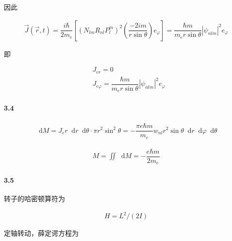 \documentclass{article}
\newcommand*{\md}{\mathop{}\!\mathrm{d}}
\newcommand*{\Jmath}{J}
\begin{document}
因此

\begin{equation*}
  \begin{aligned}
    \vec{\Jmath} \left( \vec{r}, t \right) =
    \dfrac{i \hbar}{2m_e } \left[ \left( N_{lm} R_{nl} P_l^m \right)^2 \left( \dfrac{-2 im}{r \sin \theta}  \right) e_\varphi \right]
    = \dfrac{\hbar m}{m_e r \sin \theta} \left| \psi_{nlm} \right|^2 e_{\varphi}
  \end{aligned}
\end{equation*}

即

\begin{equation*}
  \begin{aligned}
    &J_{er} = 0 \\
    &J_{e\varphi} =  \dfrac{\hbar m}{m_e r \sin \theta} \left| \psi_{nlm} \right|^2 e_{\varphi}
  \end{aligned}
\end{equation*}

\paragraph{3.4}

\begin{equation*}
  \begin{aligned}
    \md M = J_e r \md r \md \theta \cdot \pi r^2 \sin^2 \theta = - \dfrac{\pi e \hbar m}{m_e} w_{nl} r^2 \sin \theta \md r \md \varphi \md \theta 
  \end{aligned}
\end{equation*}

\begin{equation*}
  \begin{aligned}
    M = \iint \md M = - \dfrac{e \hbar m}{2m_e} 
  \end{aligned}
\end{equation*}

\paragraph{3.5}

转子的哈密顿算符为

\begin{equation*}
  \begin{aligned}
    H = L^2 / \left( 2I \right)
  \end{aligned}
\end{equation*}

定轴转动，薛定谔方程为
\end{document}
